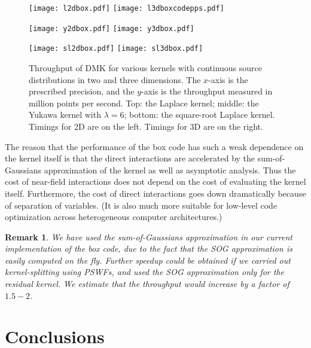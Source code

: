 \documentclass[final,letterpaper]{siamart171218}
\newtheorem{remark}[theorem]{Remark}
\newcommand{\acron}{DMK }
\begin{document}
\begin{figure}[!ht]
\centering
\texttt{[image: l2dbox.pdf]}
\hspace{0.4in}
\texttt{[image: l3dboxcodepps.pdf]}

\vspace{5mm}

\texttt{[image: y2dbox.pdf]}
\hspace{0.4in}
\texttt{[image: y3dbox.pdf]}

\vspace{5mm}

\texttt{[image: sl2dbox.pdf]}
\hspace{0.4in}
\texttt{[image: sl3dbox.pdf]}

\caption{\sf Throughput of \acron for various kernels with continuous source
  distributions
  in two and three dimensions. The $x$-axis is the prescribed precision, and
  the $y$-axis is the throughput measured in million points per second. Top: the Laplace
  kernel; middle: the Yukawa kernel with $\lambda=6$; bottom: the square-root Laplace
  kernel. Timings for 2D are on the left. Timings for 3D are on the right.}
\label{boxcodepps}
\end{figure}

The reason that the performance of the box code has such a weak dependence
on the kernel itself is that the direct interactions are accelerated by 
the sum-of-Gaussians approximation of the kernel as well as asymptotic analysis.
Thus the cost of near-field interactions does not depend 
on the cost of evaluating the kernel itself. Furthermore, the cost of direct interactions
goes down dramatically because of separation of variables. (It is also much more suitable
for low-level code optimization across heterogeneous computer architectures.)

\begin{remark}
We have used the sum-of-Gaussians approximation in our
current implementation of the box code, due to the fact that the SOG approximation 
is easily computed on the fly. Further speedup could be obtained
if we carried out kernel-splitting using PSWFs, and used the SOG approximation only 
for the residual kernel. 
We estimate that the throughput would increase by a factor of $1.5-2$.
\end{remark}

\section{Conclusions}
\end{document}
